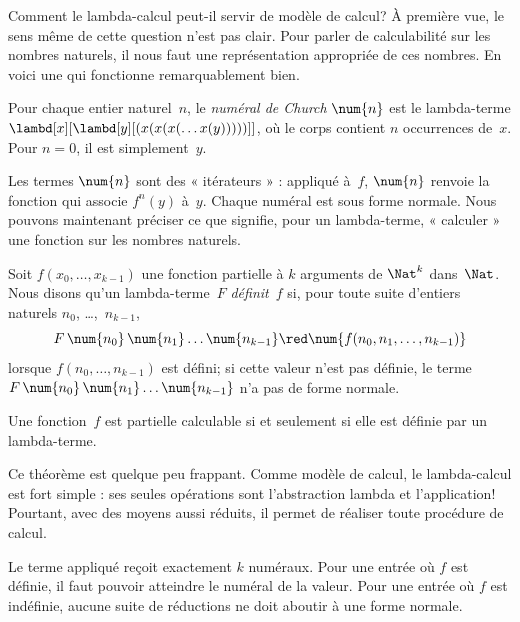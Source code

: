 \documentclass[../../../include/open-logic-section]{subfiles}
\begin{document}

Comment le lambda-calcul peut-il servir de modèle
de calcul? À première vue, le sens même de cette
question n'est pas clair. Pour parler de calculabilité
sur les nombres naturels, il nous faut une représentation
appropriée de ces nombres. En voici une qui fonctionne
remarquablement bien.

\begin{defn}
Pour chaque entier naturel~$n$, le \emph{numéral de Church}
$\num{n}$ est le lambda-terme
$\lambd[x][\lambd[y][(x(x(x(\dots x(y)))))]]$,
où le corps contient $n$ occurrences de~$x$. Pour $n=0$, il est
simplement~$y$.
\end{defn}

Les termes $\num{n}$ sont des « itérateurs » :
appliqué à~$f$, $\num{n}$ renvoie la fonction qui
associe $f^n(y)$ à~$y$. Chaque numéral est sous
forme normale. Nous pouvons maintenant préciser
ce que signifie, pour un lambda-terme, « calculer »
une fonction sur les nombres naturels.

\begin{defn}
Soit $f(x_0, \dots, x_{k-1})$ une fonction partielle
à $k$ arguments de $\Nat^k$ dans~$\Nat$. Nous disons
qu'un lambda-terme~$F$ \emph{définit}~$f$ si, pour
toute suite d'entiers naturels $n_0$, \dots,~$n_{k-1}$,
\[
F\, \num{n_0}\, \num{n_1} \dots \num{n_{k-1}}
\red \num{f(n_0, n_1, \dots, n_{k-1})}
\]
lorsque $f(n_0, \dots, n_{k-1})$ est défini;
si cette valeur n'est pas définie, le terme
$F\, \num{n_0}\, \num{n_1} \dots \num{n_{k-1}}$
n'a pas de forme normale.
\end{defn}

\begin{thm}
Une fonction~$f$ est partielle calculable si
et seulement si elle est définie par un lambda-terme.
\end{thm}

\begin{explain}
Ce théorème est quelque peu frappant. Comme modèle
de calcul, le lambda-calcul est fort simple : ses
seules opérations sont l'abstraction lambda et
l'application!{} Pourtant, avec des moyens aussi
réduits, il permet de réaliser toute procédure de
calcul.
\end{explain}

\begin{explain}
Le terme appliqué reçoit exactement $k$ numéraux. Pour une
entrée où $f$ est définie, il faut pouvoir atteindre le
numéral de la valeur. Pour une entrée où $f$ est indéfinie,
aucune suite de réductions ne doit aboutir à une forme normale.
\end{explain}
\end{document}
